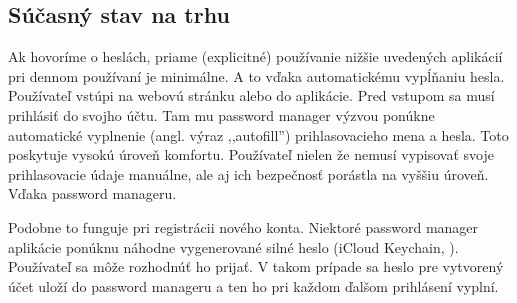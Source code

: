 \subsection{Súčasný stav na trhu}
Ak hovoríme o heslách, priame (explicitné) používanie nižšie uvedených aplikácií pri dennom používaní je minimálne. A to vďaka automatickému vypĺňaniu hesla. Používateľ vstúpi na webovú stránku alebo do aplikácie. Pred vstupom sa musí prihlásiť do svojho účtu. Tam mu password manager výzvou ponúkne automatické vyplnenie (angl. výraz ,,autofill'') prihlasovacieho mena a hesla. Toto poskytuje vysokú úroveň komfortu. Používateľ nielen že nemusí vypisovať svoje prihlasovacie údaje manuálne, ale aj ich bezpečnosť porástla na vyššiu úroveň. Vďaka password manageru.
\par Podobne to funguje pri registrácii nového konta. Niektoré password manager aplikácie ponúknu náhodne vygenerované silné heslo (iCloud Keychain, \cite{10}). Používateľ sa môže rozhodnúť ho prijať. V takom prípade sa heslo pre vytvorený účet uloží do password manageru a ten ho pri každom ďalšom prihlásení vyplní. 

